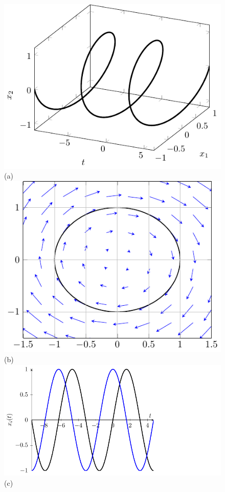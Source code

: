 \documentclass[11pt]{book}
\theoremstyle{definition}
\numberwithin{definition}{section}
\theoremstyle{theorem}
\numberwithin{theorem}{section}
\numberwithin{lemma}{section}
\numberwithin{corollary}{section}
\theoremstyle{plain}
\numberwithin{example}{section}
\begin{document}
\begin{figure}
\centering \label{fig:osciladorarmonico}
    \includegraphics[scale=1.0]{figures/osciladorarmonico-solucion.pdf}\\(a) \\
    \includegraphics[scale=1.0]{figures/osciladorarmonico-orbita.pdf}\\(b) \\
    \includegraphics[scale=0.8]{figures/osciladorarmonico-soluciones.pdf}\\(c) \\

\end{figure}
\end{document}

